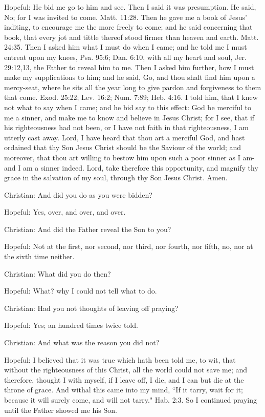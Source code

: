 Hopeful: He bid me go to him and see. Then I said it was presumption. He said, No; for I was invited to come. Matt. 11:28. Then he gave me a book of Jesus' inditing, to encourage me the more freely to come; and he said concerning that book, that every jot and tittle thereof stood firmer than heaven and earth. Matt. 24:35. Then I asked him what I must do when I came; and he told me I must entreat upon my knees, Psa. 95:6; Dan. 6:10, with all my heart and soul, Jer. 29:12,13, the Father to reveal him to me. Then I asked him further, how I must make my supplications to him; and he said, Go, and thou shalt find him upon a mercy-seat, where he sits all the year long to give pardon and forgiveness to them that come. Exod. 25:22; Lev. 16:2; Num. 7:89; Heb. 4:16. I told him, that I knew not what to say when I came; and he bid say to this effect: God be merciful to me a sinner, and make me to know and believe in Jesus Christ; for I see, that if his righteousness had not been, or I have not faith in that righteousness, I am utterly cast away. Lord, I have heard that thou art a merciful God, and hast ordained that thy Son Jesus Christ should be the Saviour of the world; and moreover, that thou art willing to bestow him upon such a poor sinner as I am-and I am a sinner indeed. Lord, take therefore this opportunity, and magnify thy grace in the salvation of my soul, through thy Son Jesus Christ. Amen.

Christian: And did you do as you were bidden?

Hopeful: Yes, over, and over, and over.

Christian: And did the Father reveal the Son to you?

Hopeful: Not at the first, nor second, nor third, nor fourth, nor fifth, no, nor at the sixth time neither.

Christian: What did you do then?

Hopeful: What? why I could not tell what to do.

Christian: Had you not thoughts of leaving off praying?

Hopeful: Yes; an hundred times twice told.

Christian: And what was the reason you did not?

Hopeful: I believed that it was true which hath been told me, to wit, that without the righteousness of this Christ, all the world could not save me; and therefore, thought I with myself, if I leave off, I die, and I can but die at the throne of grace. And withal this came into my mind, ``If it tarry, wait for it; because it will surely come, and will not tarry." Hab. 2:3. So I continued praying until the Father showed me his Son.

